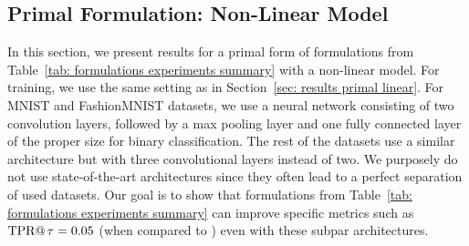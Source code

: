 \subsection{Primal Formulation: Non-Linear Model}\label{sec: results primal nonlinear}

In this section, we present results for a primal form of formulations from Table~\ref{tab: formulations experiments summary} with a non-linear model. For training, we use the same setting as in Section~\ref{sec: results primal linear}. For MNIST and FashionMNIST datasets, we use a neural network consisting of two convolution layers, followed by a max pooling layer and one fully connected layer of the proper size for binary classification. The rest of the datasets use a similar architecture but with three convolutional layers instead of two. We purposely do not use state-of-the-art architectures since they often lead to a perfect separation of used datasets. Our goal is to show that formulations from Table~\ref{tab: formulations experiments summary} can improve specific metrics such as $\operatorname{TPR@}\tau = 0.05$ (when compared to \BaseLine) even with these subpar architectures.

